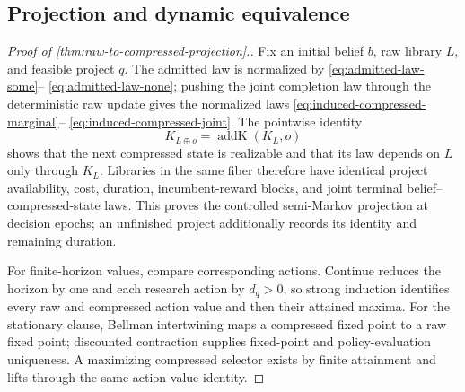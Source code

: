 \subsection{Projection and dynamic equivalence}
\label{app:di-quotient}\label{app:proofs-quotient}

\begin{proof}[Proof of \cref{thm:raw-to-compressed-projection}.]
Fix an initial belief \(b\), raw library \(L\), and feasible project \(q\).
The admitted law is normalized by \eqref{eq:admitted-law-some}--
\eqref{eq:admitted-law-none}; pushing the joint completion law through the
deterministic raw update gives the normalized laws
\eqref{eq:induced-compressed-marginal}--
\eqref{eq:induced-compressed-joint}.  The pointwise identity
\[
 K_{L\oplus o}=\operatorname{addK}(K_L,o)
\]
shows that the next compressed state is realizable and that its law depends
on \(L\) only through \(K_L\).  Libraries in the same fiber therefore have
identical project availability, cost, duration, incumbent-reward blocks, and
joint terminal belief--compressed-state laws.  This proves the controlled
semi-Markov projection at decision epochs; an unfinished project additionally
records its identity and remaining duration.

For finite-horizon values, compare corresponding actions.  Continue reduces
the horizon by one and each research action by \(d_q>0\), so strong induction
identifies every raw and compressed action value and then their attained
maxima.  For the stationary clause, Bellman intertwining maps a compressed
fixed point to a raw fixed point; discounted contraction supplies fixed-point
and policy-evaluation uniqueness.  A maximizing compressed selector exists
by finite attainment and lifts through the same action-value identity.
\end{proof}

